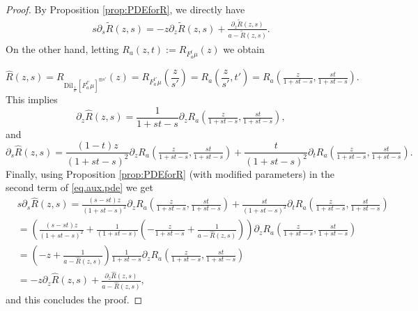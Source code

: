 \documentclass[10pt,a4paper]{amsart}
\newcommand{\dil}[1]{\mbox{Dil}_{#1}}
\newcommand{\pfreepower}[2]{F_{#1}^{#2}}
\begin{document}
\begin{proof}
By Proposition \ref{prop:PDEforR}, we directly have
\begin{align*}
    s\partial_s \tilde{R}(z,s) = -z\partial_z \tilde{R}(z,s) +\frac{ \partial_z \tilde{R}(z,s) }{ a-\tilde{R}(z,s) }.
\end{align*}
On the other hand, letting $ R_a(z,t):= R_{ \pfreepower{a}{t}\mu }(z) $ we obtain

$$
\hat{R}(z,s)= R_{\dil{\frac{1}{s'}}[F_a^{t'}\mu ]^{\boxplus s'} }(z) = R_{ F_a^{t'}\mu }\left( \frac{z}{s'} \right) = R_a\left( \frac{z}{s'},t' \right) = R_a\left( \tfrac{z}{1+st-s},\tfrac{st}{1+st-s} \right).
$$
This implies 
$$ \partial_z \hat{R}(z,s) = \frac{1}{1+st-s}\partial_zR_a\left( \tfrac{z}{1+st-s},\tfrac{st}{1+st-s} \right), $$
and
\begin{equation}
\label{eq.aux.pde}    
    \partial_s \hat{R}(z,s) = \frac{(1-t)z}{(1+st-s)^2}\partial_zR_a\left( \tfrac{z}{1+st-s},\tfrac{st}{1+st-s} \right)+ \frac{ t}{ (1+st-s)^2} \partial_tR_a\left( \tfrac{z}{1+st-s},\tfrac{st}{1+st-s} \right).
\end{equation}
Finally, using Proposition \ref{prop:PDEforR} (with modified parameters) in the second term of \eqref{eq.aux.pde} we get
\begin{align*}
    & s\partial_s \hat{R}(z,s) = \frac{(s-st)z}{(1+st-s)^2}\partial_zR_a\left( \tfrac{z}{1+st-s},\tfrac{st}{1+st-s} \right)+ \frac{st}{ (1+st-s)^2} \partial_tR_a\left( \tfrac{z}{1+st-s},\tfrac{st}{1+st-s} \right)\\
    &=\left(\tfrac{(s-st)z}{(1+st-s)^2} +\tfrac{1}{ (1+st-s)}\left( -\tfrac{z}{1+st-s}+ \tfrac{1}{a-\hat{R}(z,s)} \right) \right)\partial_zR_a\left( \tfrac{z}{1+st-s},\tfrac{st}{1+st-s} \right)\\
    &= \left( -z +\frac{1}{a-\hat{R}(z,s)} \right) \frac{ 1 }{1+st-s}\partial_zR_a\left( \tfrac{z}{1+st-s},\tfrac{st}{1+st-s} \right)\\
    &=-z\partial_z \hat{R}(z,s) +\frac{ \partial_z \hat{R}(z,s) }{ a-\hat{R}(z,s) },
\end{align*}
and this concludes the proof.
\end{proof}
\end{document}
